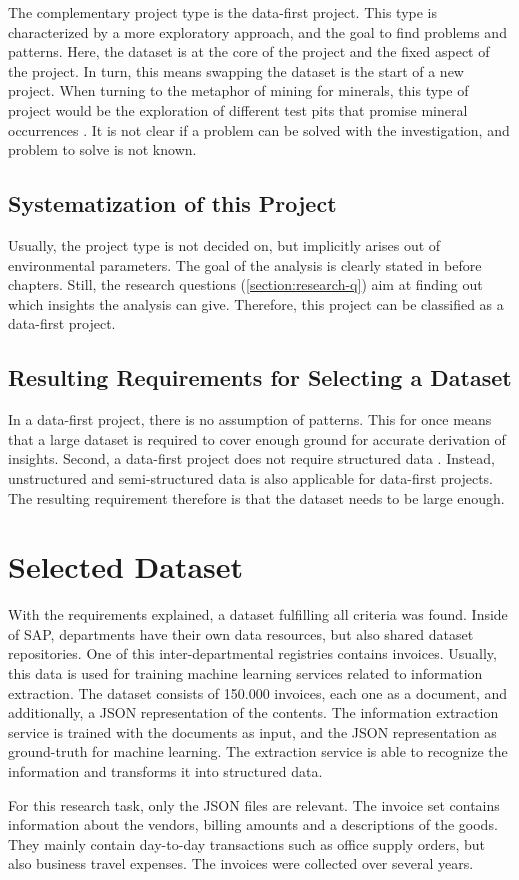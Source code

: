 	The complementary project type is the data-first project. This type is characterized by a more exploratory approach, and the goal to find problems and patterns. Here, the dataset is at the core of the project and the fixed aspect of the project. In turn, this means swapping the dataset is the start of a new project. When turning to the metaphor of mining for minerals, this type of project would be the exploration of different test pits that promise mineral occurrences \cite[p.~3051]{dataScienceProjectTypes}. It is not clear if a problem can be solved with the investigation, and problem to solve is not known.
	
	\subsection{Systematization of this Project}
	Usually, the project type is not decided on, but implicitly arises out of environmental parameters. The goal of the analysis is clearly stated in before chapters. Still, the research questions (\ref{section:research-q}) aim at finding out which insights the analysis can give. Therefore, this project can be classified as a data-first project.
	
	\subsection{Resulting Requirements for Selecting a Dataset}
	In a data-first project, there is no assumption of patterns. This for once means that a large dataset is required to cover enough ground for accurate derivation of insights. Second, a data-first project does not require structured data \cite{srivastavaDataMining}. Instead, unstructured and semi-structured data is also applicable for data-first projects. The resulting requirement therefore is that the dataset needs to be large enough.
	
	
	\section{Selected Dataset}
	With the requirements explained, a dataset fulfilling all criteria was found. Inside of SAP, departments have their own data resources, but also shared dataset repositories. One of this inter-departmental registries contains invoices. Usually, this data is used for training machine learning services related to information extraction. The dataset consists of 150.000 invoices, each one as a document, and additionally, a \ac{JSON} representation of the contents.	The information extraction service is trained with the documents as input, and the \ac{JSON} representation as ground-truth for machine learning. The extraction service is able to recognize the information and transforms it into structured data.	
	
	For this research task, only the \ac{JSON} files are relevant. The invoice set contains information about the vendors, billing amounts and a descriptions of the goods. They mainly contain day-to-day transactions such as office supply orders, but also business travel expenses. The invoices were collected over several years.

	
	
